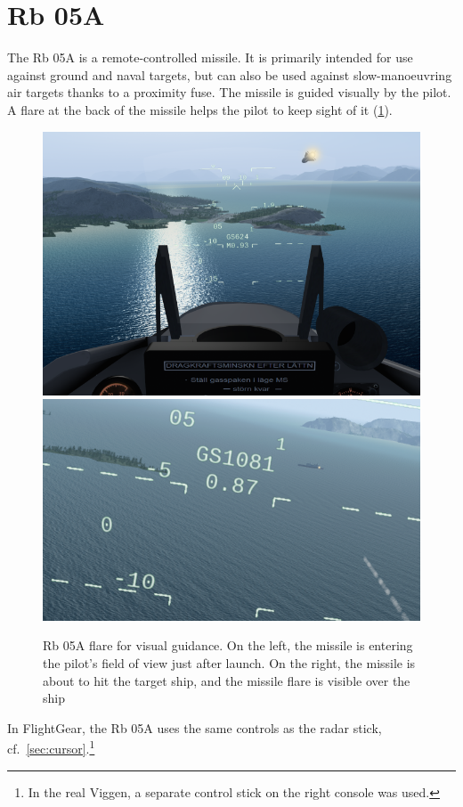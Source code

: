 \section{Rb 05A}
The Rb 05A is a remote-controlled missile.
It is primarily intended for use against ground and naval targets,
but can also be used against slow-manoeuvring air targets thanks to a proximity fuse.
The missile is guided visually by the pilot.
A flare at the back of the missile helps the pilot to keep sight of it (\cref{fig:rb05-flare}).

\begin{figure}
  \centering
  \includegraphics[height=0.3\textwidth]{images/weapons/rb_05a_start_popup.png}
  \includegraphics[height=0.3\textwidth]{images/weapons/rb_05a_before_impact_ship.png}
  \caption[Rb 05A flare for visual guidance]{Rb 05A flare for visual guidance.
    On the left, the missile is entering the pilot's field of view just after launch.
    On the right, the missile is about to hit the target ship,
    and the missile flare is visible over the ship
  }
  \label{fig:rb05-flare}
\end{figure}

In FlightGear, the Rb 05A uses the same controls as the radar stick, cf.\ \cref{sec:cursor}.\footnote{%
  In the real Viggen, a separate control stick on the right console was used.
}

